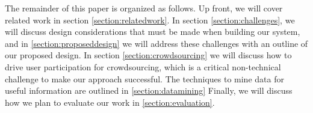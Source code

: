 \documentclass{acm_proc_article-sp}
\begin{document}
The remainder of this paper is organized as follows. Up front, we will cover 
related work in section \ref{section:relatedwork}. In section \ref{section:challenges},
we will discuss design considerations that must be made when building our system, and in 
\ref{section:proposeddesign} we will address these challenges with an outline of
our proposed design. In section \ref{section:crowdsourcing} we will discuss how to drive
user participation for crowdsourcing, which is a critical non-technical 
challenge to make our approach successful. The techniques to mine data for useful 
information are outlined in \ref{section:datamining}
Finally, we will discuss how we plan to evaluate our work in \ref{section:evaluation}.









{}

\end{document}
